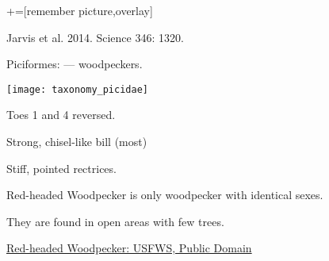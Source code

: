 \documentclass[t]{beamer}
\newcommand{\backoneline}{\vspace{-\baselineskip}}
\begin{document}
{
{	+=[remember picture,overlay]
\begin{frame}[b, plain]

	\tiny\hfill Jarvis et al. 2014. Science 346: 1320.
\end{frame}
}}


\begin{frame}{Piciformes:  — woodpeckers.}

\backoneline

\begin{multicols}{2}
\texttt{[image: taxonomy\_picidae]}

\columnbreak

 Toes 1 and 4 reversed.

\medskip

Strong, chisel-like bill (most)

\medskip

Stiff, pointed rectrices.

\vspace{3\baselineskip}

Red-headed Woodpecker is only woodpecker with identical sexes.

\medskip

They are found in open areas with few trees.

\tinyfill \href{https://flickr.com/photos/usfwsmidwest/42163328934}{Red-headed Woodpecker: USFWS, Public Domain}
\end{multicols}


\end{frame}
\end{document}
